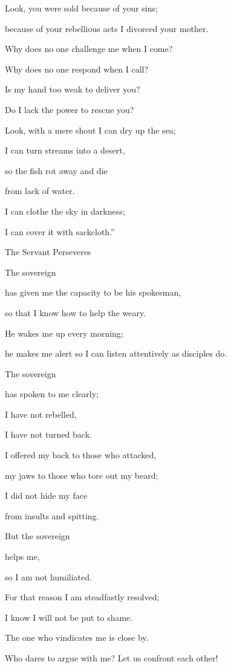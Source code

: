 {\par }{\Q Look,
you were sold
because of your sins;
\par }{\Q because of your rebellious
acts I divorced
your mother.
\par }{\Q {}Why
does no
one
challenge me when I come?
\par }{\Q Why does no
one respond
when I call?

\par }{\Q Is my hand
too weak
to deliver
you?
\par }{\Q Do I lack
the power
to rescue
you?
\par }{\Q Look,
with a mere shout
I can dry up
the sea;
\par }{\Q I can turn
streams
into a desert,
\par }{\Q so the fish
rot away
and die
\par }{\Q from lack of water.
\par }{\Q {}I can clothe
the sky
in darkness;
\par }{\Q I can
cover
it with sackcloth.”
\par }{\SH The Servant Perseveres
\par }{\Q {}The sovereign

{}
has given
me the capacity to be his spokesman,
\par }{\Q so that I know
how to help
the weary.
\par }{\Q He wakes
me up
every morning;
\par }{\Q he makes
me alert
so I can listen attentively
as disciples do.
\par }{\Q {}The sovereign

{}
has spoken
to me clearly;
\par }{\Q I
have not
rebelled,
\par }{\Q I have not
turned
back.
\par }{\Q {}I offered
my back
to those who attacked,
\par }{\Q my jaws
to those who tore out
my beard;
\par }{\Q I did not
hide
my face
\par }{\Q from insults
and spitting.
\par }{\Q {}But the sovereign

{}
helps
me,
\par }{\Q so
I
am not
humiliated.
\par }{\Q For that reason
I am steadfastly
resolved;
\par }{\Q I know
I will not
be put to shame.
\par }{\Q {}The one who
vindicates me
is close
by.
\par }{\Q Who dares
to argue
with
me? Let us confront each other!

}
